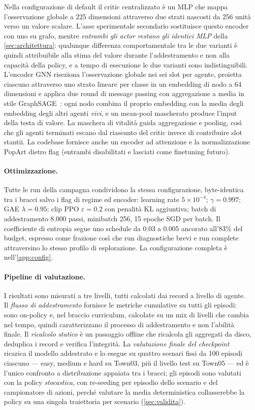 Nella configurazione di default il critic centralizzato è un MLP che
mappa l'osservazione globale a 225 dimensioni attraverso due strati
nascosti da 256 unità verso un valore scalare. L'asse sperimentale
secondario sostituisce questo encoder con uno su grafo, mentre
\emph{entrambi gli actor restano gli identici MLP} della
\cref{sec:architettura}: qualunque differenza comportamentale tra le due
varianti è quindi attribuibile alla stima del valore durante
l'addestramento e non alla capacità della policy, e a tempo di
esecuzione le due varianti sono indistinguibili. L'encoder GNN riseziona
l'osservazione globale nei sei slot per agente, proietta ciascuno
attraverso uno strato lineare per classe in un embedding di nodo a 64
dimensioni e applica due round di message passing con aggregazione a
media in stile GraphSAGE~\cite{hamilton2017graphsage}: ogni nodo combina
il proprio embedding con la media degli embedding degli altri agenti
\emph{vivi}, e un mean-pool mascherato produce l'input della testa di
valore. La maschera di vitalità guida aggregazione e pooling, così che
gli agenti terminati escano dal riassunto del critic invece di
contribuire slot stantii. La codebase fornisce anche un encoder ad
attenzione e la normalizzazione PopArt dietro flag (entrambi disabilitati
e lasciati come finetuning futuro).

\paragraph{Ottimizzazione.}
Tutte le run della campagna condividono la stessa configurazione,
byte-identica tra i bracci salvo i flag di regime ed encoder: learning
rate $5\times10^{-4}$; $\gamma = 0.997$; GAE $\lambda = 0.95$; clip PPO
$\varepsilon = 0.2$ con penalità KL aggiuntiva; batch di addestramento
8{.}000 passi, minibatch 256, 15 epoche SGD per batch. Il coefficiente
di entropia segue uno schedule da 0.03 a 0.005 ancorato all'83\% del
budget, espresso come frazione così che run diagnostiche brevi e run
complete attraversino lo stesso profilo di esplorazione. La
configurazione completa è nell'\cref{app:config}.

\paragraph{Pipeline di valutazione.}
I risultati sono misurati a tre livelli, tutti calcolati dai record a
livello di agente. Il \emph{flusso di addestramento} fornisce le
metriche cumulative su tutti gli episodi: sono on-policy e, nel braccio
curriculum, calcolate su un mix di livelli che cambia nel tempo, quindi
caratterizzano il processo di addestramento e non l'abilità finale. Il
\emph{ricalcolo statico} è un passaggio offline che ricalcola gli
aggregati da disco, deduplica i record e verifica l'integrità. La
\emph{valutazione finale del checkpoint} ricarica il modello addestrato
e lo esegue su quattro scenari fissi da 100 episodi ciascuno --- easy,
medium e hard su Town03, più il livello test su Town05 --- ed è l'unico
confronto a distribuzione appaiata tra i bracci; gli episodi sono
valutati con la policy \emph{stocastica}, con re-seeding per episodio
dello scenario e del campionatore di azioni, perché valutare la media
deterministica collasserebbe la policy su una singola traiettoria per
scenario (\cref{sec:validita}).
